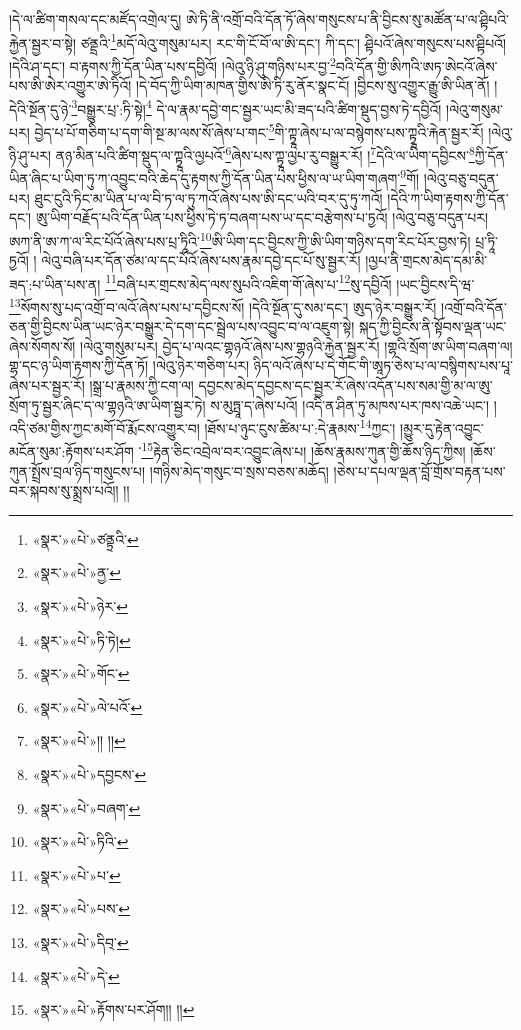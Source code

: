 །དེ་ལ་ཚིག་གསལ་དང་མཛོད་འགྲེལ་དུ། ཨེ་ཏི་ནི་འགྲོ་བའི་དོན་ཏོ་ཞེས་གསུངས་པ་ནི་བྱིངས་སུ་མཚོན་པ་ལ་ཤྟིཔའི་རྐྱེན་སྦྱར་བ་སྟེ། ཙནྡྲའི་\footnote{«སྣར་»«པེ་»ཙནྟྲའི་}མདོ་ལེའུ་གསུམ་པར། རང་གི་ངོ་བོ་ལ་ཨི་དང་། ཀི་དང་། ཤྟིཔའོ་ཞེས་གསུངས་པས་ཤྟིཔའོ། །དེའི་ཤ་དང་། བ་རྟགས་ཀྱི་དོན་ཡིན་པས་དབྱིའོ། །ལེའུ་ཉི་ཤུ་གཉིས་པར་བྱ་\footnote{«སྣར་»«པེ་»ནྱ་}བའི་དོན་གྱི་ཨིཀའི་ཨཏ་ཨེངའོ་ཞེས་པས་ཨི་ཨེར་འགྱུར་ཨེ་ཏིའོ། །དེ་བོད་ཀྱི་ཡིག་མཁན་གྱིས་ཨི་ཏི་རུ་ནོར་སྣང་ངོ། །བྱིངས་སུ་འགྱུར་རྒྱུ་ཨི་ཡིན་ནོ། །དེའི་སྔོན་དུ་ཉེ་\footnote{«སྣར་»«པེ་»ཉེར་}བསྒྱུར་པྲ་:ཏི་སྟེ།\footnote{«སྣར་»«པེ་»ཏི་ཏེ།} དེ་ལ་རྣམ་དབྱེ་གང་སྦྱར་ཡང་མི་ཟད་པའི་ཚིག་སྡུད་བྱས་ཏེ་དབྱིའོ། །ལེའུ་གསུམ་པར། བྱེད་པ་པོ་གཅིག་པ་དག་གི་སྔ་མ་ལས་སོ་ཞེས་པ་གང་\footnote{«སྣར་»«པེ་»གོང་}གི་ཀྟྭཱ་ཞེས་པ་ལ་བསྙེགས་པས་ཀྟྭཱའི་རྐེན་སྦྱར་རོ། །ལེའུ་ཉི་ཤུ་པར། ནཉ་མིན་པའི་ཚིག་སྡུད་ལ་ཀྟྭཱའི་ལྱཔའོ་\footnote{«སྣར་»«པེ་»ལེ་པའོ་}ཞེས་པས་ཀྟྭཱ་ལྱཔ་རུ་བསྒྱུར་རོ། །\footnote{«སྣར་»«པེ་»།། །།}དེའི་ལ་ཡིག་དབྱིངས་\footnote{«སྣར་»«པེ་»དབྱངས་}ཀྱི་དོན་ཡིན་ཞིང་པ་ཡིག་ཏུ་ཀ་འབྱུང་བའི་ཆེད་དུ་རྟགས་ཀྱི་དོན་ཡིན་པས་ཕྱིས་ལ་ཡ་ཡིག་གཞག་\footnote{«སྣར་»«པེ་»བཞག་}གོ། །ལེའུ་བཅུ་བདུན་པར། ཐུང་ངུའི་ཏིང་མ་ཡིན་པ་ལ་བི་ཏ་ལ་ཏུ་ཀའོ་ཞེས་པས་ཨི་དང་ཡའི་བར་དུ་ཏུ་ཀའོ། །དེའི་ཀ་ཡིག་རྟགས་ཀྱི་དོན་དང་། ཨུ་ཡིག་བརྗོད་པའི་དོན་ཡིན་པས་ཕྱིས་ཏེ་ཏ་བཞག་པས་ཡ་དང་བརྩེགས་པ་ཏྱའོ། །ལེའུ་བཅུ་བདུན་པར། ཨཀ་ནི་ཨ་ཀ་ལ་རིང་པོའོ་ཞེས་པས་པྲ་ཏཱིའི་\footnote{«སྣར་»«པེ་»ཏིའི་}ཨི་ཡིག་དང་བྱིངས་ཀྱི་ཨི་ཡིག་གཉིས་དག་རིང་པོར་བྱས་ཏེ། པྲ་ཏཱི་ཏྱའོ། །
ལེའུ་བཞི་པར་དོན་ཙམ་ལ་དང་པོའོ་ཞེས་པས་རྣམ་དབྱེ་དང་པོ་སུ་སྦྱར་རོ། །ལྱཔ་ནི་གྲངས་མེད་དམ་མི་ཟད་:པ་ཡིན་པས་ན། \footnote{«སྣར་»«པེ་»པ་}བཞི་པར་གྲངས་མེད་ལས་སུཔའི་འཇིག་གོ་ཞེས་པ་\footnote{«སྣར་»«པེ་»པས་}སུ་དབྱིའོ། །ཡང་བྱིངས་དི་ཝ་\footnote{«སྣར་»«པེ་»དིབ྄་}སོགས་སུ་པད་འགྲོ་བ་ལའོ་ཞེས་པས་པ་དབྱིངས་སོ། །དེའི་སྔོན་དུ་སམ་དང་། ཨུད་ཉེར་བསྒྱུར་རོ། །འགྲོ་བའི་དོན་ཅན་གྱི་བྱིངས་ཡིན་ཡང་ཉེར་བསྒྱུར་དེ་དག་དང་སྦྲེལ་པས་འབྱུང་བ་ལ་འཇུག་སྟེ། སྐད་ཀྱི་བྱིངས་ནི་སྟོབས་ལྡན་ཡང་ཞེས་སོགས་སོ། །ལེའུ་གསུམ་པར། བྱེད་པ་ལའང་གྷཉའོ་ཞེས་པས་གྷཉའི་རྐྱེན་སྦྱར་རོ། །གྷའི་སྲོག་ཨ་ཡིག་བཞག་ལ། གྷ་དང་ཉ་ཡིག་རྟགས་ཀྱི་དོན་ཏོ། །ལེའུ་ཉེར་གཅིག་པར། ཉིད་ལའོ་ཞེས་པ་དེ་གོང་གི་ཨཱཏ་ཅེས་པ་ལ་བསྙིགས་པས་པཱ་ཞེས་པར་སྦྱར་རོ། །སྒྲ་པ་རྣམས་ཀྱི་ངག་ལ། དབྱངས་མེད་དབྱངས་དང་སྦྱར་རོ་ཞེས་འདོན་པས་སམ་གྱི་མ་ལ་ཨུ་སྲོག་ཏུ་སྦྱར་ཞིང་ད་ལ་གྷཉའི་ཨ་ཡིག་སྦྱར་ཏེ། ས་མུཏྤཱ་ད་ཞེས་པའོ། །འདི་ན་ཤིན་ཏུ་མཁས་པར་ཁས་འཆེ་ཡང་། །འདི་ཙམ་གྱིས་ཀྱང་མགོ་བོ་རྨོངས་འགྱུར་བ། །ཐོས་པ་ཉུང་ངུས་ཚིམ་པ་:དེ་རྣམས་\footnote{«སྣར་»«པེ་»དེ་}ཀྱང་། །མྱུར་དུ་རྟེན་འབྱུང་མངོན་སུམ་:རྟོགས་པར་ཤོག ་\footnote{«སྣར་»«པེ་»རྟོགས་པར་ཤོག།། །།}རྟེན་ཅིང་འབྲེལ་བར་འབྱུང་ཞེས་པ། །ཆོས་རྣམས་ཀུན་གྱི་ཆོས་ཉིད་ཀྱིས། །ཆོས་ཀུན་སྤྲོས་བྲལ་ཉིད་གསུངས་པ། །གཉིས་མེད་གསུང་བ་སྲས་བཅས་མཆོད། །ཅེས་པ་དཔལ་ལྡན་བློ་གྲོས་བརྟན་པས་བར་སྐབས་སུ་སྨྲས་པའོ།། །།